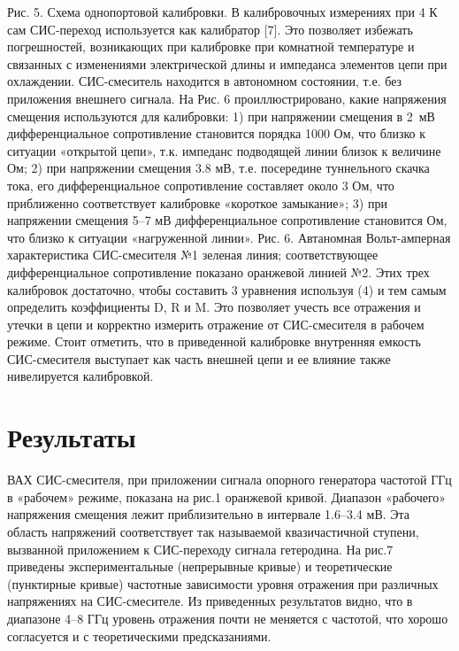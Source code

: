 \documentclass[a4paper]{article}
\begin{document}
Рис. 5. Схема однопортовой калибровки.
В калибровочных измерениях при 4 К сам СИС-переход используется как калибратор [7]. Это позволяет избежать погрешностей, возникающих при калибровке при комнатной температуре и связанных с изменениями электрической длины и импеданса элементов цепи при охлаждении. СИС-смеситель находится в автономном состоянии, т.е. без приложения внешнего сигнала. На Рис. 6 проиллюстрировано, какие напряжения смещения используются для калибровки:  1) при напряжении смещения в 2 мВ  дифференциальное сопротивление становится порядка 1000 Ом, что близко к ситуации «открытой цепи», т.к. импеданс подводящей линии близок к величине  Ом; 2) при напряжении смещения 3.8 мВ, т.е. посередине туннельного скачка тока, его дифференциальное сопротивление составляет около 3 Ом, что приближенно соответствует калибровке «короткое замыкание»; 3) при напряжении смещения 5–7 мВ дифференциальное сопротивление становится  Ом, что близко к ситуации «нагруженной линии». 
Рис. 6. Автаномная Вольт-амперная характеристика СИС-смесителя №1 зеленая линия; соответствующее дифференциальное сопротивление показано оранжевой линией №2.
Этих трех калибровок достаточно, чтобы составить 3 уравнения используя (4) и тем самым определить коэффициенты D, R и M. Это позволяет учесть все отражения и утечки в цепи и корректно измерить отражение от СИС-смесителя в рабочем режиме. Стоит отметить, что в приведенной калибровке внутренняя емкость СИС-смесителя выступает как часть внешней цепи и ее влияние также нивелируется калибровкой.

\section{Результаты}
 ВАХ СИС-смесителя, при приложении сигнала опорного генератора частотой  ГГц в «рабочем» режиме, показана на рис.1  оранжевой кривой. Диапазон «рабочего» напряжения смещения лежит приблизительно в интервале 1.6–3.4 мВ. Эта область напряжений соответствует так называемой квазичастичной ступени, вызванной приложением к СИС-переходу сигнала гетеродина. На рис.7 приведены экспериментальные (непрерывные кривые) и теоретические (пунктирные кривые) частотные зависимости уровня отражения при различных напряжениях на СИС-смесителе. Из приведенных результатов видно, что в диапазоне 4–8 ГГц уровень отражения почти не меняется с частотой, что хорошо согласуется и с теоретическими предсказаниями. 
\end{document}
